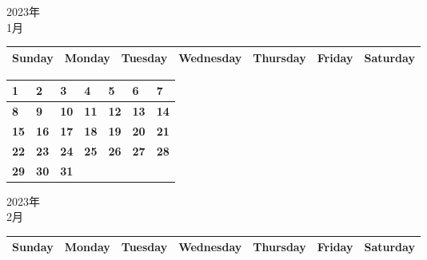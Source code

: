 \documentclass[a4paper,landscape]{jsarticle}
\newcommand{\dig}{\hspace{29mm}}
\newcommand{\tdig}{\hspace{27mm}}
\newcommand{\LBF}{\LARGE\textbf}
\begin{document}
\pagestyle{empty}

\begin{center}
	\LARGE 2023年\\
	\LARGE 1月
\end{center}

\begingroup
\renewcommand{\arraystretch}{1.4}
\begin{tabular}{|>{\centering\arraybackslash}p{32mm}|>{\centering\arraybackslash}p{32mm}|>{\centering\arraybackslash}p{32mm}|>{\centering\arraybackslash}p{32mm}|>{\centering\arraybackslash}p{32mm}|>{\centering\arraybackslash}p{32mm}|>{\centering\arraybackslash}p{32mm}|}
\hline
\large Sunday&\large Monday &\large Tuesday&\large Wednesday&\large Thursday&\large Friday&\large Saturday\\
\hline
\end{tabular}
\endgroup

\begingroup
\renewcommand{\arraystretch}{4}
\begin{tabular}{|p{32mm}|p{32mm}|p{32mm}|p{32mm}|p{32mm}|p{32mm}|p{32mm}|}
\hline
\raisebox{30pt} {\dig\LBF{1}}&\raisebox{30pt} {\dig\LBF{2}}&\raisebox{30pt} {\dig\LBF{3}}&\raisebox{30pt} {\dig\LBF{4}}&\raisebox{30pt} {\dig\LBF{5}}&\raisebox{30pt} {\dig\LBF{6}}&\raisebox{30pt} {\dig\LBF{7}}\\
\hline
\raisebox{30pt} {\dig\LBF{8}}&\raisebox{30pt} {\dig\LBF{9}}&\raisebox{30pt} {\tdig\LBF{10}}&\raisebox{30pt} {\tdig\LBF{11}}&\raisebox{30pt} {\tdig\LBF{12}}&\raisebox{30pt} {\tdig\LBF{13}}&\raisebox{30pt} {\tdig\LBF{14}}\\
\hline
\raisebox{30pt} {\tdig\LBF{15}}&\raisebox{30pt} {\tdig\LBF{16}}&\raisebox{30pt} {\tdig\LBF{17}}&\raisebox{30pt} {\tdig\LBF{18}}&\raisebox{30pt} {\tdig\LBF{19}}&\raisebox{30pt} {\tdig\LBF{20}}&\raisebox{30pt} {\tdig\LBF{21}}\\
\hline
\raisebox{30pt} {\tdig\LBF{22}}&\raisebox{30pt} {\tdig\LBF{23}}&\raisebox{30pt} {\tdig\LBF{24}}&\raisebox{30pt} {\tdig\LBF{25}}&\raisebox{30pt} {\tdig\LBF{26}}&\raisebox{30pt} {\tdig\LBF{27}}&\raisebox{30pt} {\tdig\LBF{28}}\\
\hline
\raisebox{30pt} {\tdig\LBF{29}}&\raisebox{30pt} {\tdig\LBF{30}}&\raisebox{30pt} {\tdig\LBF{31}}&&&&\\
\hline
\end{tabular}
\endgroup
\newpage\begin{center}
	\LARGE 2023年\\
	\LARGE 2月
\end{center}

\begingroup
\renewcommand{\arraystretch}{1.4}
\begin{tabular}{|>{\centering\arraybackslash}p{32mm}|>{\centering\arraybackslash}p{32mm}|>{\centering\arraybackslash}p{32mm}|>{\centering\arraybackslash}p{32mm}|>{\centering\arraybackslash}p{32mm}|>{\centering\arraybackslash}p{32mm}|>{\centering\arraybackslash}p{32mm}|}
\hline
\large Sunday&\large Monday &\large Tuesday&\large Wednesday&\large Thursday&\large Friday&\large Saturday\\
\hline
\end{tabular}
\endgroup
\end{document}
